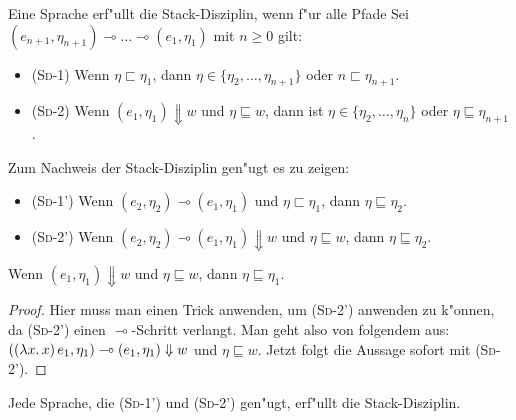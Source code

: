 \documentclass[12pt,fleqn,a4paper]{article}
\newcommand{\RN}[1]{\mbox{\textsc{(#1)}}}
\begin{document}

\begin{definition}
  Eine Sprache erf"ullt die Stack-Disziplin, wenn f"ur alle Pfade
  Sei $(e_{n+1},\eta_{n+1}) \multimap \ldots \multimap (e_{1},\eta_{1})$  mit $n \ge 0$ gilt:
  \begin{itemize}
  \item \RN{Sd-1} Wenn $\eta \sqsubset \eta_1$, dann $\eta \in \{\eta_2,\ldots,\eta_{n+1}\}$
    oder $n\sqsubset\eta_{n+1}$.
  \item \RN{Sd-2} Wenn $(e_1,\eta_1) \Downarrow w$ und $\eta \sqsubseteq w$, dann ist
    $\eta \in \{\eta_2,\ldots,\eta_n\}$ oder $\eta \sqsubseteq \eta_{n+1}$.
  \end{itemize}
\end{definition}

\begin{lemma}
  Zum Nachweis der Stack-Disziplin gen"ugt es zu zeigen:
  \begin{itemize}
  \item \RN{Sd-1'} Wenn $(e_2,\eta_2) \multimap (e_1,\eta_1)$ und $\eta \sqsubset \eta_1$, dann
    $\eta \sqsubseteq \eta_2$.
  \item \RN{Sd-2'} Wenn $(e_2,\eta_2) \multimap (e_1,\eta_1) \Downarrow w$ und
    $\eta \sqsubseteq w$, dann $\eta \sqsubseteq \eta_2$.
  \end{itemize}
\end{lemma}

\begin{corollary} \label{corollary:SD-2}
  Wenn $(e_1,\eta_1) \Downarrow w$ und $\eta \sqsubseteq w$, dann $\eta \sqsubseteq \eta_1$.
\end{corollary}

\begin{proof}
  Hier muss man einen Trick anwenden, um \RN{Sd-2'} anwenden zu k"onnen, da \RN{Sd-2'} einen
  $\multimap$-Schritt verlangt. Man geht also von folgendem aus:
  $((\lambda x.\,x)\,e_1,\eta_1) \multimap (e_1,\eta_1) \Downarrow w$ und $\eta \sqsubseteq w$.
  Jetzt folgt die Aussage sofort mit \RN{Sd-2'}.
\end{proof}

\begin{theorem}
  Jede Sprache, die \RN{Sd-1'} und \RN{Sd-2'} gen"ugt, erf"ullt die Stack-Disziplin.
\end{theorem}
\end{document}
